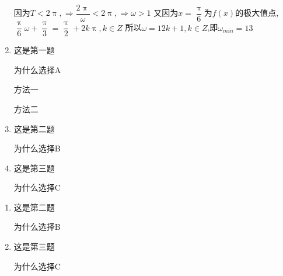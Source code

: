 \documentclass{sxtzh}
\begin{document}
\begin{enumerate}
\begin{solution}
       \par
       因为$T < 2\uppi,\Rightarrow \dfrac{2\uppi}{\omega}<2\uppi,\Rightarrow \omega >1$
       又因为$x = \dfrac{\uppi}{6}$为$f(x)$的极大值点,$\dfrac{\uppi}{6} \omega  + \dfrac{\uppi}{3} = \dfrac{\uppi}{2} + 2k\uppi,k\in Z$
       所以$\omega = 12k + 1,k\in Z$,即$\omega_{min} = 13$
    \end{solution}
    \item {} 这是第一题
    \begin{solution}
        为什么选择A
        \begin{fangfa}
            方法一
        \end{fangfa}
        \begin{fangfa}
            方法二
        \end{fangfa}
    \end{solution}
    \item 这是第二题
    \begin{solution}
        为什么选择B
    \end{solution}
    \item 这是第三题
    \begin{solution}
        为什么选择C
    \end{solution}
\end{enumerate}
\tiankong
\begin{enumerate}[resume]
    \item 这是第二题
    \begin{solution}
        为什么选择B
    \end{solution}
    \item 这是第三题
    \begin{solution}
        为什么选择C
    \end{solution}
\end{enumerate}
\jieda
\end{document}
